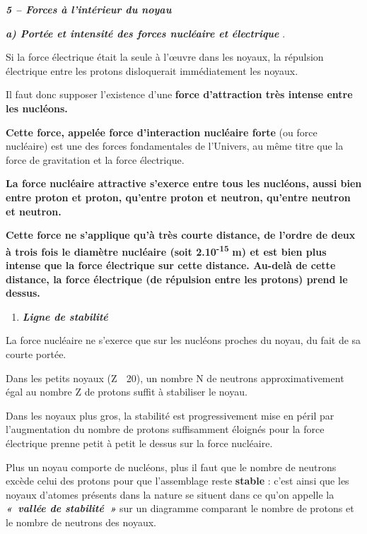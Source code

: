 \emph{\textbf{5 -- Forces à l'intérieur du noyau }}

\emph{\textbf{a) Portée et intensité des forces nucléaire et
électrique}} .

Si la force électrique était la seule à l'œuvre dans les noyaux, la
répulsion électrique entre les protons disloquerait immédiatement les
noyaux.

Il faut donc supposer l'existence d'une \textbf{force d'attraction très
intense entre les nucléons. }

\textbf{Cette force, appelée force d'interaction nucléaire forte }(ou
force nucléaire) est une des forces fondamentales de l'Univers, au même
titre que la force de gravitation et la force électrique.

\textbf{La force nucléaire attractive s'exerce entre tous les nucléons,
aussi bien entre proton et proton, qu'entre proton et neutron, qu'entre
neutron et neutron. }

\textbf{Cette force ne s'applique qu'à très courte distance, de l'ordre
de deux à trois fois le diamètre nucléaire (soit
2.10}\textsuperscript{\textbf{-15}}\textbf{ m) et est bien plus intense
que la force électrique sur cette distance. Au-delà de cette distance,
la force électrique (de répulsion entre les protons) prend le dessus. }

\begin{enumerate}
\def\labelenumi{\alph{enumi})}
\setcounter{enumi}{1}
\tightlist
\item
  \emph{\textbf{Ligne de stabilité}}
\end{enumerate}

La force nucléaire ne s'exerce que sur les nucléons proches du noyau, du
fait de sa courte portée.

Dans les petits noyaux (Z  20), un nombre N de neutrons
approximativement égal au nombre Z de protons suffit à stabiliser le
noyau.

Dans les noyaux plus gros, la stabilité est progressivement mise en
péril par l'augmentation du nombre de protons suffisamment éloignés pour
la force électrique prenne petit à petit le dessus sur la force
nucléaire.

Plus un noyau comporte de nucléons, plus il faut que le nombre de
neutrons excède celui des protons pour que l'assemblage reste
\textbf{\textbf{stable}} : c'est ainsi que les noyaux d'atomes présents
dans la nature se situent dans ce qu'on appelle la
\emph{\textbf{«~vallée de stabilité~»}} sur un diagramme comparant le
nombre de protons et le nombre de neutrons des noyaux.

